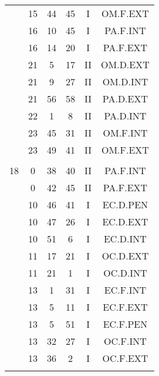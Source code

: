 \documentclass[12pt, a4paper]{article}
\begin{document}
\begin{multicols}{3}
{\begin{tabular}{c c c c c c}
	 	 	 	 & 15 & 44 & 45 & I & OM.F.EXT\\%
	 	 	 	 & 16 & 10 & 45 & I & PA.F.INT\\%
	 	 	 	 & 16 & 14 & 20 & I & PA.F.EXT\\%
	 	 	 	 & 21 & 5 & 17 & II & OM.D.EXT\\%
	 	 	 	 & 21 & 9 & 27 & II & OM.D.INT\\%
	 	 	 	 & 21 & 56 & 58 & II & PA.D.EXT\\%
	 	 	 	 & 22 & 1 & 8 & II & PA.D.INT\\%
	 	 	 	 & 23 & 45 & 31 & II & OM.F.INT\\%
	 	 	 	 & 23 & 49 & 41 & II & OM.F.EXT\\%
	 	 	 	 & & & & & \\%
	 	 	 	18 & 0 & 38 & 40 & II & PA.F.INT\\%
	 	 	 	 & 0 & 42 & 45 & II & PA.F.EXT\\%
	 	 	 	 & 10 & 46 & 41 & I & EC.D.PEN\\%
	 	 	 	 & 10 & 47 & 26 & I & EC.D.EXT\\%
	 	 	 	 & 10 & 51 & 6 & I & EC.D.INT\\%
	 	 	 	 & 11 & 17 & 21 & I & OC.D.EXT\\%
	 	 	 	 & 11 & 21 & 1 & I & OC.D.INT\\%
	 	 	 	 & 13 & 1 & 31 & I & EC.F.INT\\%
	 	 	 	 & 13 & 5 & 11 & I & EC.F.EXT\\%
	 	 	 	 & 13 & 5 & 51 & I & EC.F.PEN\\%
	 	 	 	 & 13 & 32 & 27 & I & OC.F.INT\\%
	 	 	 	 & 13 & 36 & 2 & I & OC.F.EXT\\%
	 	 	 	 & & & & & \\%

\end{tabular}}
\end{multicols}
\end{document}
